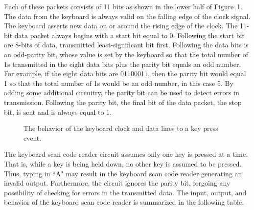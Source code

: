 Each of these packets consists of 11 bits as shown in the lower half 
of Figure~\ref{fig:Keyboard}.  The data from the keyboard is always 
valid on the falling edge of the clock signal.  The keyboard asserts
new data on or around the rising edge of the clock.  The 11-bit data 
packet always begins with a start bit equal to 0.  Following the
start bit are 8-bits of data, transmitted least-significant bit first.
Following the data bits is an odd-parity bit, whose value is set by the 
keyboard so that the total number of 1s transmitted in the eight data
bits plus the parity bit equals an odd number.  For example, if the
eight data bits are 01100011, then the parity bit would equal 1 so that 
the total number of 1s would be an odd number, in this case 5.  By
adding some additional circuitry, the parity bit can be used to detect 
errors in transmission.   Following the parity bit, the final bit of
the data packet, the stop bit, is sent and is always equal to 1.

\begin{figure}[ht]
\caption{The behavior of the keyboard clock and data lines to a 
key press event.}
\label{fig:Keyboard}
\end{figure}

The keyboard scan code reader circuit assumes only one key is
pressed at a time.  That is, while a key is being held down,  
no other key is assumed to be pressed.  Thus, typing in ``A" may 
result in the keyboard scan code reader generating an invalid output. 
Furthermore, the circuit ignores the parity bit, forgoing any 
possibility of checking for errors in the transmitted data.  The
input, output, and behavior of the keyboard scan code reader is
summarized in the following table.

